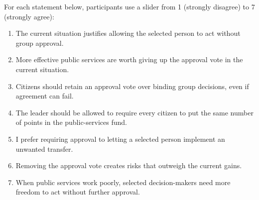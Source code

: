 For each statement below, participants use a slider from 1 (strongly disagree) to 7 (strongly agree):
\begin{enumerate}[resume]
  \item The current situation justifies allowing the selected person to act without group approval.
  \item More effective public services are worth giving up the approval vote in the current situation.
  \item Citizens should retain an approval vote over binding group decisions, even if agreement can fail.
  \item The leader should be allowed to require every citizen to put the same number of points in the public-services fund.
  \item I prefer requiring approval to letting a selected person implement an unwanted transfer.
  \item Removing the approval vote creates risks that outweigh the current gains.
  \item When public services work poorly, selected decision-makers need more freedom to act without further approval.
\end{enumerate}

